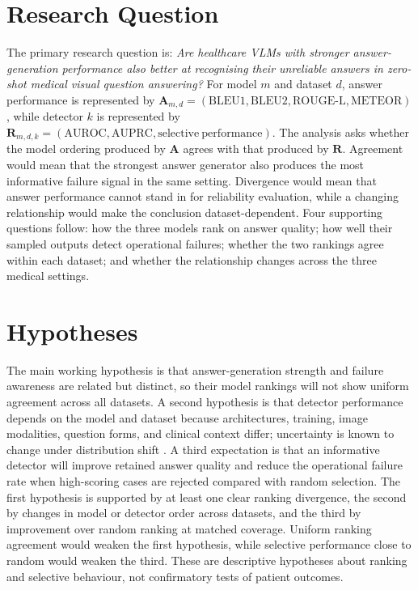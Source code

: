\section{Research Question}

The primary research question is: \emph{Are healthcare VLMs with stronger answer-generation performance also better at recognising their unreliable answers in zero-shot medical visual question answering?} For model $m$ and dataset $d$, answer performance is represented by $\mathbf{A}_{m,d}=(\mathrm{BLEU1},\mathrm{BLEU2},\mathrm{ROUGE\mbox{-}L},\mathrm{METEOR})$, while detector $k$ is represented by $\mathbf{R}_{m,d,k}=(\mathrm{AUROC},\mathrm{AUPRC},\mathrm{selective\ performance})$. The analysis asks whether the model ordering produced by $\mathbf{A}$ agrees with that produced by $\mathbf{R}$. Agreement would mean that the strongest answer generator also produces the most informative failure signal in the same setting. Divergence would mean that answer performance cannot stand in for reliability evaluation, while a changing relationship would make the conclusion dataset-dependent. Four supporting questions follow: how the three models rank on answer quality; how well their sampled outputs detect operational failures; whether the two rankings agree within each dataset; and whether the relationship changes across the three medical settings.

\section{Hypotheses}

The main working hypothesis is that answer-generation strength and failure awareness are related but distinct, so their model rankings will not show uniform agreement across all datasets. A second hypothesis is that detector performance depends on the model and dataset because architectures, training, image modalities, question forms, and clinical context differ; uncertainty is known to change under distribution shift \citep{ovadia2019uncertainty}. A third expectation is that an informative detector will improve retained answer quality and reduce the operational failure rate when high-scoring cases are rejected compared with random selection. The first hypothesis is supported by at least one clear ranking divergence, the second by changes in model or detector order across datasets, and the third by improvement over random ranking at matched coverage. Uniform ranking agreement would weaken the first hypothesis, while selective performance close to random would weaken the third. These are descriptive hypotheses about ranking and selective behaviour, not confirmatory tests of patient outcomes.

